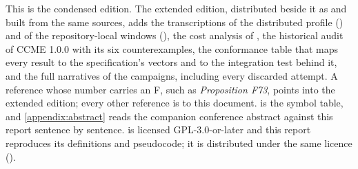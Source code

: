 This is the condensed edition. The extended edition, distributed beside it as
 and built from the same sources, adds the
transcriptions of the distributed profile () and of the
repository-local windows (), the cost analysis of
, the historical audit of CCME 1.0.0 with its six
counterexamples, the conformance table that maps every result to the
specification's vectors and to the integration test behind it, and the full
narratives of the campaigns, including every discarded attempt. A reference
whose number carries an F, such as \emph{Proposition F73}, points into the
extended edition; every other reference is to this document.
 is the symbol table, and \cref{appendix:abstract}
reads the companion conference abstract against this report sentence by
sentence. \SPEC{} is licensed GPL-3.0-or-later and this report reproduces its
definitions and pseudocode; it is distributed under the same licence
().
